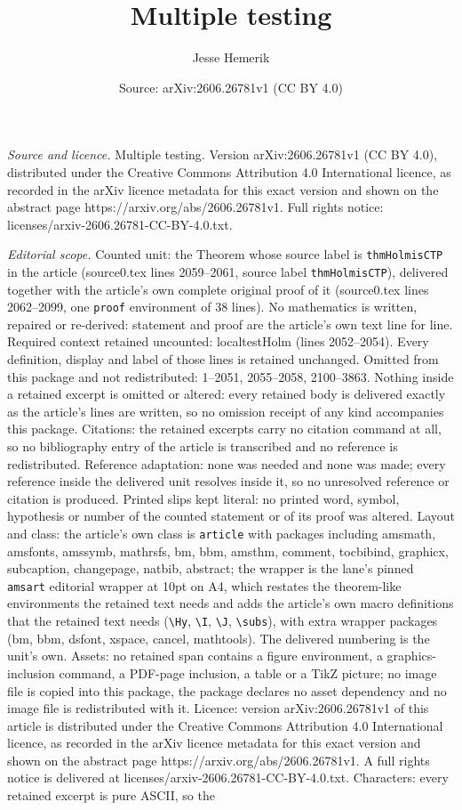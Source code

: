 \documentclass[10pt,a4paper]{amsart}
\title[Multiple testing]{Multiple testing}
\author{Jesse Hemerik}
\date{Source: arXiv:2606.26781v1 (CC BY 4.0)}
\begin{document}
\maketitle

\noindent\emph{Source and licence.} Multiple testing. Version arXiv:2606.26781v1 (CC BY 4.0), distributed under the Creative Commons Attribution 4.0 International licence, as recorded in the arXiv licence metadata for this exact version and shown on the abstract page https://arxiv.org/abs/2606.26781v1. Full rights notice: licenses/arxiv-2606.26781-CC-BY-4.0.txt.\par\smallskip

\noindent\textit{Editorial scope.} Counted unit: the Theorem whose source label is \texttt{thmHolmisCTP} in the article (source0.tex lines 2059--2061, source label \texttt{thmHolmisCTP}), delivered together with the article's own complete original proof of it (source0.tex lines 2062--2099, one \texttt{proof} environment of 38 lines). No mathematics is written, repaired or re-derived: statement and proof are the article's own text line for line. Required context retained uncounted: localtestHolm (lines 2052--2054). Every definition, display and label of those lines is retained unchanged. Omitted from this package and not redistributed: 1--2051, 2055--2058, 2100--3863. Nothing inside a retained excerpt is omitted or altered: every retained body is delivered exactly as the article's lines are written, so no omission receipt of any kind accompanies this package. Citations: the retained excerpts carry no citation command at all, so no bibliography entry of the article is transcribed and no reference is redistributed. Reference adaptation: none was needed and none was made; every reference inside the delivered unit resolves inside it, so no unresolved reference or citation is produced. Printed slips kept literal: no printed word, symbol, hypothesis or number of the counted statement or of its proof was altered. Layout and class: the article's own class is \texttt{article} with packages including amsmath, amsfonts, amssymb, mathrsfs, bm, bbm, amsthm, comment, tocbibind, graphicx, subcaption, changepage, natbib, abstract; the wrapper is the lane's pinned \texttt{amsart} editorial wrapper at 10pt on A4, which restates the theorem-like environments the retained text needs and adds the article's own macro definitions that the retained text needs (\texttt{\textbackslash Hy}, \texttt{\textbackslash I}, \texttt{\textbackslash J}, \texttt{\textbackslash subs}), with extra wrapper packages (bm, bbm, dsfont, xspace, cancel, mathtools). The delivered numbering is the unit's own. Assets: no retained span contains a figure environment, a graphics-inclusion command, a PDF-page inclusion, a table or a TikZ picture; no image file is copied into this package, the package declares no asset dependency and no image file is redistributed with it. Licence: version arXiv:2606.26781v1 of this article is distributed under the Creative Commons Attribution 4.0 International licence, as recorded in the arXiv licence metadata for this exact version and shown on the abstract page https://arxiv.org/abs/2606.26781v1. A full rights notice is delivered at licenses/arxiv-2606.26781-CC-BY-4.0.txt. Characters: every retained excerpt is pure ASCII, so the 
\end{document}
